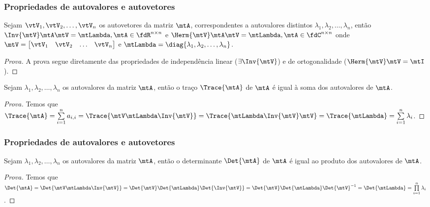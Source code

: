 \begin{frame}
  \frametitle{Propriedades de autovalores e autovetores}
  \vspace{-0.25\baselineskip}
  \begin{propriedade}
    Sejam $\vtV_1, \vtV_2, \ldots, \vtV_n$ os autovetores da matriz $\mtA$, correspondentes a autovalores distintos $\lambda_1, \lambda_2, \ldots, \lambda_n$, então $\Inv{\mtV} \mtA \mtV = \mtLambda, \mtA \in \fdR^{n\times n}$ e $\Herm{\mtV} \mtA \mtV = \mtLambda, \mtA \in \fdC^{n\times n}$ onde $\mtV = \begin{bmatrix} \vtV_1 & \vtV_2 & \ldots & \vtV_n\end{bmatrix}$ e $\mtLambda = \diag\{\lambda_1, \lambda_2, \ldots, \lambda_n\}$.
  \end{propriedade}
  \vspace{-0.25\baselineskip}
  \begin{proof}[Prova]
    A prova segue diretamente das propriedades de independência linear ($\exists \Inv{\mtV}$) e de ortogonalidade ($\Herm{\mtV}\mtV = \mtI$).
  \end{proof}
  \vspace{-0.25\baselineskip}
  \begin{propriedade}
    Sejam $\lambda_1, \lambda_2, \ldots, \lambda_n$ os autovalores da matriz $\mtA$, então o traço $\Trace{\mtA}$ de $\mtA$ é igual à soma dos autovalores de $\mtA$.
  \end{propriedade}
  \vspace{-0.25\baselineskip}
  \begin{proof}[Prova]
    Temos que $\Trace{\mtA} = \sum\limits_{i=1}^{n} a_{i,i} = \Trace{\mtV \mtLambda \Inv{\mtV}} = \Trace{\mtLambda \Inv{\mtV} \mtV} = \Trace{\mtLambda} = \sum\limits_{i=1}^{n} \lambda_i$.
  \end{proof}
\end{frame}

\begin{frame}
  \frametitle{Propriedades de autovalores e autovetores}
  \begin{propriedade}
    Sejam $\lambda_1, \lambda_2, \ldots, \lambda_n$ os autovalores da matriz $\mtA$, então o determinante $\Det{\mtA}$ de $\mtA$ é igual ao produto dos autovalores de $\mtA$.
  \end{propriedade}
  \vspace{-0.25\baselineskip}
  \begin{proof}[Prova]
    Temos que $\Det{\mtA} = \Det{\mtV \mtLambda \Inv{\mtV}} = \Det{\mtV} \Det{\mtLambda} \Det{\Inv{\mtV}} = \Det{\mtV} \Det{\mtLambda} \Det{\mtV}^{-1} = \Det{\mtLambda} = \prod\limits_{i=1}^{n} \lambda_i$.
  \end{proof}
\end{frame}

